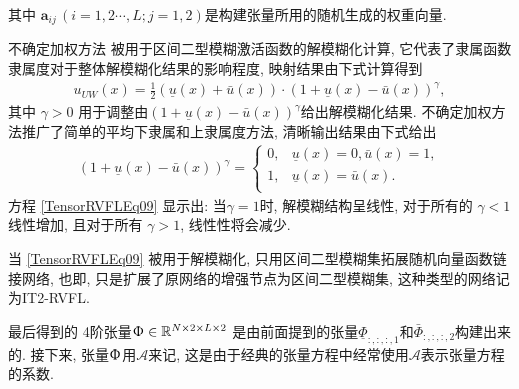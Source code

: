 其中 $\bm {a} _{ij} \,(i=1,2\cdots,L; j=1,2)$是构建张量所用的随机生成的权重向量.
\begin{remark}
不确定加权方法\cite{RunklerCoupland2018-6356}  被用于区间二型模糊激活函数的解模糊化计算,
它代表了隶属函数隶属度对于整体解模糊化结果的影响程度, 映射结果由下式计算得到
\begin{align} \label{TensorRVFLEq08}
  u_{UW} (x) =\frac 1 2 (\underline u(x) + \bar u(x))\cdot (1+\underline u(x)-\bar u(x))^\gamma,
\end{align}
其中 $\gamma > 0$ 用于调整由$(1+\underline u(x)-\bar u(x))^\gamma$给出解模糊化结果.
不确定加权方法推广了简单的平均下隶属和上隶属度方法, 清晰输出结果由下式给出
\begin{align} \label{TensorRVFLEq09}
  (1+\underline u(x)-\bar u(x))^\gamma=
  \left\{
  \begin{array} {ll}
    0,& \underline u(x)=0, \bar u(x)=1,\\
    1,&\underline u(x)=\bar u(x).\\
  \end{array}
  \right.
\end{align}
方程 \eqref{TensorRVFLEq09} 显示出: 当$\gamma =1$时, 解模糊结构呈线性, 对于所有的 $\gamma<1$ 线性增加, 且对于所有 $\gamma>1$, 线性性将会减少.
\end{remark}
\begin{remark}
当 \eqref{TensorRVFLEq09} 被用于解模糊化, 只用区间二型模糊集拓展随机向量函数链接网络, 也即,  只是扩展了原网络的增强节点为区间二型模糊集,  这种类型的网络记为IT2-RVFL.
\end{remark}

最后得到的 4阶张量$\Upphi \in \mathbb R^{N\times 2\times L \times 2} $ 是由前面提到的张量$\underline\Phi_{:,:,:,1} $和$\bar \Phi_{:,:,:,2} $构建出来的.
接下来, 张量$\Upphi$用$\mathcal A$来记,  这是由于经典的张量方程中经常使用$\mathcal A$表示张量方程的系数.

